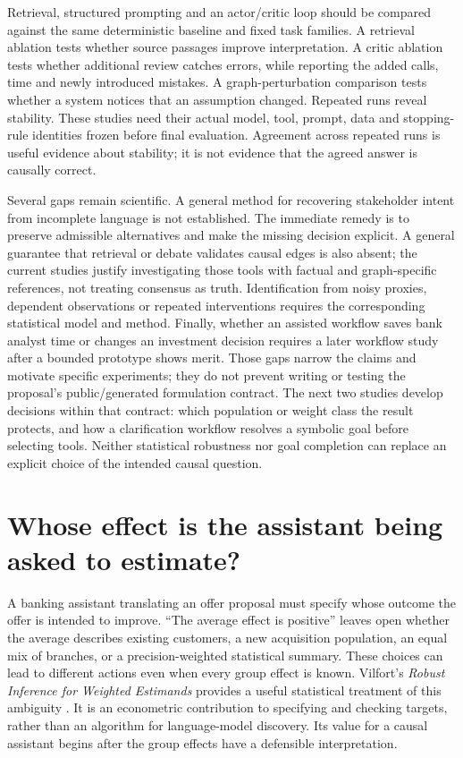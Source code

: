 Retrieval, structured prompting and an actor/critic loop should be
compared against the same deterministic baseline and fixed task
families. A retrieval ablation tests whether source passages improve
interpretation. A critic ablation tests whether additional review
catches errors, while reporting the added calls, time and newly
introduced mistakes. A graph-perturbation comparison tests whether a
system notices that an assumption changed. Repeated runs reveal
stability. These studies need their actual model, tool, prompt, data and
stopping-rule identities frozen before final evaluation. Agreement
across repeated runs is useful evidence about stability; it is not
evidence that the agreed answer is causally correct.

Several gaps remain scientific. A general method for recovering
stakeholder intent from incomplete language is not established. The
immediate remedy is to preserve admissible alternatives and make the
missing decision explicit. A general guarantee that retrieval or debate
validates causal edges is also absent; the current studies justify
investigating those tools with factual and graph-specific references,
not treating consensus as truth. Identification from noisy proxies,
dependent observations or repeated interventions requires the
corresponding statistical model and method. Finally, whether an assisted
workflow saves bank analyst time or changes an investment decision
requires a later workflow study after a bounded prototype shows merit.
Those gaps narrow the claims and motivate specific experiments; they do
not prevent writing or testing the proposal's public/generated
formulation contract. The next two studies develop decisions within that
contract: which population or weight class the result protects, and how a
clarification workflow resolves a symbolic goal before selecting tools.
Neither statistical robustness nor goal completion can replace an explicit
choice of the intended causal question. \label{exec13:formulation-end}


\section{Whose effect is the assistant being asked to estimate?}
\label{exec22:targets-scope}

A banking assistant translating an offer proposal must specify whose outcome
the offer is intended to improve. ``The average effect is positive'' leaves
open whether the average describes existing customers, a new acquisition
population, an equal mix of branches, or a precision-weighted statistical
summary. These choices can lead to different actions even when every group
effect is known. Vilfort's \emph{Robust Inference for Weighted Estimands}
provides a useful statistical treatment of this ambiguity
\cite{exec22_weighted_vilfort}. It is an econometric contribution to specifying
and checking targets, rather than an algorithm for language-model discovery.
Its value for a causal assistant begins after the group effects have a
defensible interpretation.

